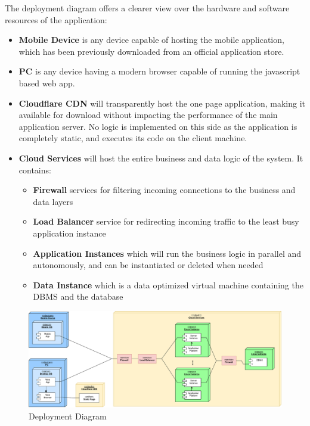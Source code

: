 The deployment diagram offers a clearer view over the hardware and software resources of the application:
\begin{itemize}
    \item \textbf{Mobile Device} is any device capable of hosting the mobile application, which has been previously downloaded from an official application store.
    \item \textbf{PC} is any device having a modern browser capable of running the javascript based web app.
    \item \textbf{Cloudflare CDN} will transparently host the one page application, making it available for download without impacting the performance of the main application server. No logic is implemented on this side as the application is completely static, and executes its code on the client machine.
    \item \textbf{Cloud Services} will host the entire business and data logic of the system. It contains:
    \begin{itemize}
        \item \textbf{Firewall} services for filtering incoming connections to the business and data layers
        \item \textbf{Load Balancer} service for redirecting incoming traffic to the least busy application instance
        \item \textbf{Application Instances} which will run the business logic in parallel and autonomously, and can be instantiated or deleted when needed
        \item \textbf{Data Instance} which is a data optimized virtual machine containing the DBMS and the database
    \end{itemize}
\end{itemize}

\begin{figure}[H]
    \includegraphics[width=\linewidth]{images/draw.io/deployment_structure.pdf}
    \caption{Deployment Diagram}
    \label{fig:deployment_structure}
\end{figure}

